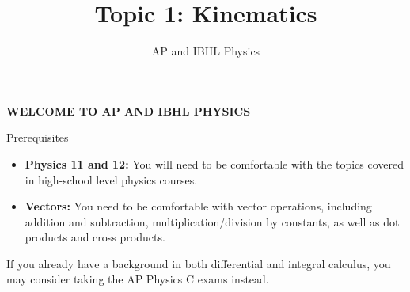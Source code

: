 \documentclass[12pt,compress,aspectratio=169]{beamer}
\title{Topic 1: Kinematics}
\subtitle{AP and IBHL Physics}
\begin{document}
\begin{frame}{}

  {\LARGE
    \begin{center}
      \textbf{WELCOME TO AP AND IBHL PHYSICS}
    \end{center}
  }
\end{frame}



\begin{frame}{Prerequisites}
  \begin{itemize}
  \item\textbf{Physics 11 and 12:} You will need to be comfortable with the
    topics covered in high-school level physics courses.
  \item\textbf{Vectors:} You need to be comfortable with vector operations,
    including addition and subtraction, multiplication/division by constants,
    as well as dot products and cross products.
  \end{itemize}
  If you already have a background in both differential and integral calculus,
  you may consider taking the AP Physics C exams instead.
\end{frame}



%



\begin{frame}
  \titlepage
\end{frame}



%
\end{document}
